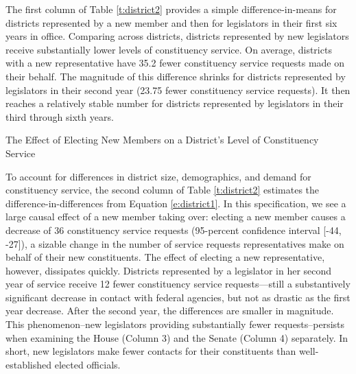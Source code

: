 \documentclass[12pt]{article}
\begin{document}
The first column of Table \ref{t:district2} provides a simple difference-in-means for districts represented by a new member and then for legislators in their first six years in office. Comparing across districts, districts represented by new legislators receive substantially lower levels of constituency service. On average, districts with a new representative have 35.2 fewer constituency service requests made on their behalf. The magnitude of this difference shrinks for districts represented by legislators in their second year (23.75 fewer constituency service requests). It then reaches a relatively stable number for districts represented by legislators in their third through sixth years.%



\begin{table}[hbt!]
\caption{The Effect of Electing New Members on a District's Level of Constituency Service} \label{t:district2}
\begin{minipage}{\textwidth}
\begin{center}

\end{center}
\end{minipage}
\end{table}


To account for differences in district size, demographics, and demand for constituency service, the second column of Table \ref{t:district2} estimates the difference-in-differences from Equation \ref{e:district1}. In this specification, we see a large causal effect of a new member taking over: electing a new member causes a decrease of 36 constituency service requests (95-percent confidence interval [-44, -27]), a sizable change in the number of service requests representatives make on behalf of their new constituents. %
The effect of electing a new representative, however, dissipates quickly. Districts represented by a legislator in her second year of service receive 12 fewer constituency service requests---still a substantively significant decrease in contact with federal agencies, but not as drastic as the first year decrease. After the second year, the differences are smaller in magnitude. This phenomenon--new legislators providing substantially fewer requests--persists when examining the House (Column 3) and the Senate (Column 4) separately. In short, new legislators make fewer contacts for their constituents than well-established elected officials.  
\end{document}
